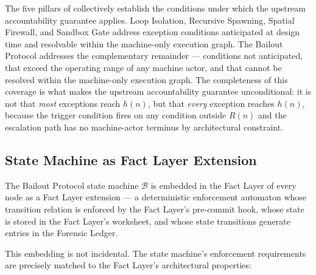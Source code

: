 The five pillars of \bxthree{} collectively establish the conditions under which the upstream accountability guarantee applies. Loop Isolation, Recursive Spawning, Spatial Firewall, and Sandbox Gate address exception conditions anticipated at design time and resolvable within the machine-only execution graph. The Bailout Protocol addresses the complementary remainder --- conditions not anticipated, that exceed the operating range of any machine actor, and that cannot be resolved within the machine-only execution graph. The completeness of this coverage is what makes the upstream accountability guarantee unconditional: it is not that \emph{most} exceptions reach $h(n)$, but that \emph{every} exception reaches $h(n)$, because the trigger condition fires on any condition outside $R(n)$ and the escalation path has no machine-actor terminus by architectural constraint.

\subsection{State Machine as Fact Layer Extension}
\label{sec:state-machine-extension}

The Bailout Protocol state machine $\mathcal{B}$ is embedded in the Fact Layer of every \bxthree{} node as a Fact Layer extension --- a deterministic enforcement automaton whose transition relation is enforced by the Fact Layer's pre-commit hook, whose state is stored in the Fact Layer's worksheet, and whose state transitions generate entries in the Forensic Ledger.

This embedding is not incidental. The state machine's enforcement requirements are precisely matched to the Fact Layer's architectural properties:

